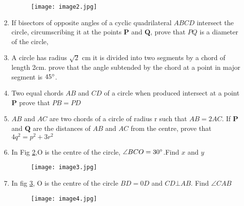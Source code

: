 \documentclass[12pt]{article}
\let\vec\mathbf
\begin{document}
\begin{enumerate}
	\begin{figure}[h!]                        \begin{center}                                   \texttt{[image: image2.jpg]}                          \end{center}                            \caption{}                                       \label{fig:2}                    \end{figure}
	\item If bisectors of opposite angles of a cyclic quadrilateral $ABCD$ intersect the circle, circumscribing it at the points $\vec{P}$ and $\vec{Q}$, prove that $PQ$ is a diameter of the circle,
\item A circle has radius $\sqrt{2}$ cm it is divided into two segments by a chord of length 2cm. prove that the angle subtended by the chord at a point in major segment is $45\degree$.
\item Two equal chords $AB$ and $CD$ of a circle when produced intersect at a point $\vec{P}$ prove that $PB=PD$
\item $AB$ and $AC$ are two chords of a circle of radius r such that $AB=2AC$. If $\vec{P}$ and $\vec{Q}$ are the distances of $AB$ and $AC$ from the centre, prove that $4q^2=p^2+3r^2$
\item In Fig \ref{fig:3},O is the centre of the circle, $\angle BCO=30\degree$.Find $x$ and $y$
	\begin{figure}[h!]                        \begin{center}                                   \texttt{[image: image3.jpg]}                          \end{center}                            \caption{}                                       \label{fig:3}                    \end{figure}
	\item In fig \ref{fig:4}, O is the centre of the circle $BD=0D$ and $CD \bot AB$. Find $\angle CAB$
	\begin{figure}[h!]                        \begin{center}                                   \texttt{[image: image4.jpg]}                          \end{center}                            \caption{}                                       \label{fig:4}                    \end{figure}
\end{enumerate}

	
\end{document}
